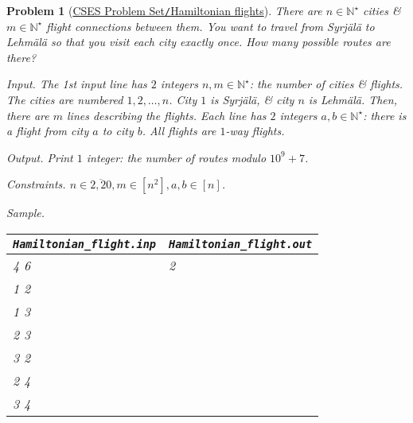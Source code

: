 \documentclass{article}
\newtheorem{problem}{Problem}
\begin{document}
\begin{problem}[\href{https://cses.fi/problemset/task/1690}{CSES Problem Set{\tt/}Hamiltonian flights}]
    There are $n\in\mathbb{N}^\star$ cities \& $m\in\mathbb{N}^\star$ flight connections between them. You want to travel from Syrjälä to Lehmälä so that you visit each city exactly once. How many possible routes are there?
    \item {\sf Input.} The 1st input line has $2$ integers $n,m\in\mathbb{N}^\star$: the number of cities \& flights. The cities are numbered $1,2,\ldots,n$. City $1$ is Syrjälä, \& city $n$ is Lehmälä. Then, there are $m$ lines describing the flights. Each line has $2$ integers $a,b\in\mathbb{N}^\star$: there is a flight from city $a$ to city $b$. All flights are $1$-way flights.
    \item {\sf Output.} Print $1$ integer: the number of routes modulo $10^9 + 7$.
    \item {\sf Constraints.} $n\in\overline{2,20},m\in[n^2],a,b\in[n]$.
    \item {\sf Sample.}
    \begin{table}[H]
        \centering
        \begin{tabular}{|l|l|}
            \hline
            \verb|Hamiltonian_flight.inp| & \verb|Hamiltonian_flight.out| \\
            \hline
            4 6 & 2\\
            1 2 & \\
            1 3 & \\
            2 3 & \\
            3 2 & \\
            2 4 & \\
            3 4 & \\
            \hline
        \end{tabular}
    \end{table}
\end{problem}
\end{document}
